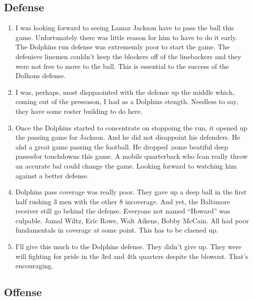 

\subsection*{Defense}

\begin{enumerate}
\item I was looking forward to seeing Lamar Jackson have to pass the ball this game.  Unfortunately there was little reason for him to have to do it early.  The Dolphins run defense was extrememly poor to start the game.  The defenisve linemen couldn't keep the blockers off of the linebackers and they were not free to move to the ball.  This is essential to the success of the Dolhons defense.
\item I was, perhaps, most disppaointed with the defense up the middle which, coming out of the preseason, I had as a Dolphins stength.  Needless to say, they have some roster building to do here.
\item Once the Dolphins started to concentrate on stoppoing the run, it opened up the passing game for Jackson.  And he did not disappoint his defenders.  He ahd a great game passing the football.  He dropped ;some beatiful deep passesfor touchdowns this game.  A mobile quarterback who fcan really throw an accurate bal could change the game.  Looking forward to watching him against a better defense.
\item Dolphins pass coverage was really poor.  They gave up a deep ball in the first half rushing 3 men with the other 8 incoverage.  And yet, the Baltimore receiver still go behind the defense.  Everyone not named ``Howard'' was culpable.  Jamal Wiltz, Eric Rowe, Walt Aikens, Bobby McCain.  All had poor fundamentals in coverage at some point.  This has to be claened up.
  \item I'll give this much to the Dolphins defense.  They didn't give up.  They were will fighting for pride in the 3rd and 4th quarters despite the blowout.  That's encouraging.
\end{enumerate}

\subsection*{Offense}

